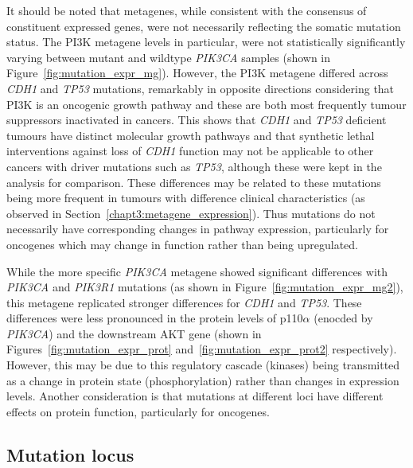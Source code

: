 It should be noted that metagenes, while consistent with the consensus of constituent expressed genes, were not necessarily reflecting the somatic mutation status. The PI3K \citep{Gatza2011} metagene levels in particular, were not statistically significantly varying between mutant and wildtype \textit{PIK3CA} samples (shown in Figure~\ref{fig:mutation_expr_mg}). However, the PI3K metagene differed across \textit{CDH1} and \textit{TP53} mutations, remarkably in opposite directions considering that PI3K is an oncogenic growth pathway and these are both most frequently tumour suppressors inactivated in cancers. This shows that \textit{CDH1} and \textit{TP53} deficient tumours have distinct molecular growth pathways and that synthetic lethal interventions against loss of \textit{CDH1} function may not be applicable to other cancers with driver mutations such as \textit{TP53}, although these were kept in the analysis for comparison. These differences may be related to these mutations being more frequent in tumours with difference clinical characteristics (as observed in Section~\ref{chapt3:metagene_expression}).  Thus mutations do not necessarily have corresponding changes in pathway expression, particularly for oncogenes which may change in function rather than being upregulated.


While the more specific \textit{PIK3CA} \citep{Gatza2014} metagene showed significant differences with \textit{PIK3CA} and \textit{PIK3R1} mutations (as shown in Figure~\ref{fig:mutation_expr_mg2}), this metagene replicated stronger differences for \textit{CDH1} and \textit{TP53}.  These differences were less pronounced in the protein levels of p110$\alpha$ (enocded by \textit{PIK3CA}) and the downstream AKT gene (shown in Figures~\ref{fig:mutation_expr_prot} and~\ref{fig:mutation_expr_prot2} respectively). However, this may be due to this regulatory cascade (kinases) being transmitted as a change in protein state (phosphorylation) rather than changes in expression levels. Another consideration is that mutations at different loci have different effects on protein function, particularly for oncogenes.

\FloatBarrier

\iffalse
\subsection{Mutation locus}  \label{chapt3:metagene_mut_locus}

